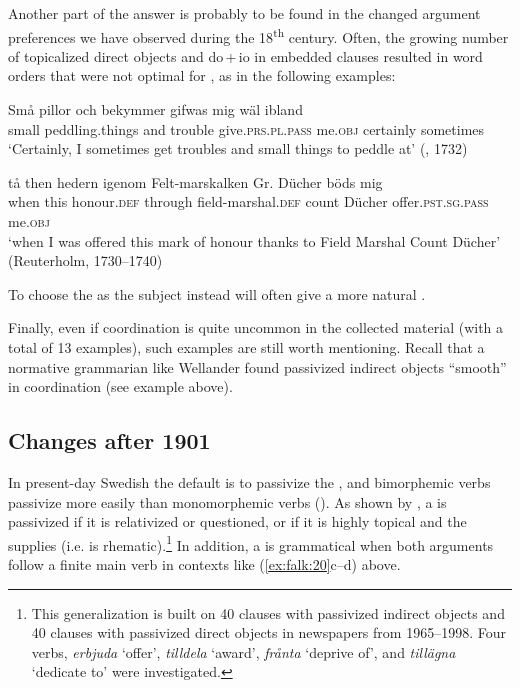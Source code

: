 \documentclass[output=paper]{langscibook}
\begin{document}
Another part of the answer is probably to be found in the changed argument preferences we have observed during the 18\textsuperscript{th} century. Often, the growing number of topicalized direct objects and do\,+\,io in embedded clauses resulted in word orders that were not optimal for , as in the following examples:


\ea%
    \label{ex:falk:26}

\ea
\gll Små  pillor          och  bekymmer  gifwas        mig    wäl ibland\\
      small  peddling.things  and  trouble     give.\textsc{prs.pl.pass}  me.\textsc{obj}  certainly              sometimes\\
\glt ‘Certainly, I sometimes get troubles and small things to peddle at’ (, 1732)

\ex
\gll tå    then  hedern    igenom  Felt-marskalken    Gr.      Dücher böds            mig\\
when  this  honour.\textsc{def}  through  field-marshal.\textsc{def}    count    Dücher      offer.\textsc{pst.sg.pass}    me\textsc{.obj}\\
\glt ‘when I was offered this mark of honour thanks to Field Marshal Count Dücher’ (Reuterholm, 1730–1740)
\z
\z


To choose the  as the subject instead will often give a more natural .


Finally, even if coordination is quite uncommon in the collected material (with a total of 13 examples), such examples are still worth mentioning. Recall that a normative grammarian like Wellander found passivized indirect objects “smooth” in coordination (see example  above).


\subsection{Changes after 1901}\label{sec:falk:5.3}


In present-day Swedish the default is to passivize the , and bimorphemic verbs passivize more easily than monomorphemic  verbs (\citealt{HolmbergPlatzack1995,Lundquist2004,HaddicanHolmberg2019}). As shown by \citet{Lundquist2004}, a  is passivized if it is relativized or questioned, or if it is highly topical and the  supplies  (i.e. is rhematic).\footnote{This generalization is built on 40 clauses with passivized indirect objects and 40 clauses with passivized direct objects in newspapers from 1965–1998. Four verbs, \textit{erbjuda} ‘offer’, \textit{tilldela} ‘award’, \textit{frånta} ‘deprive of’, and \textit{tillägna} ‘dedicate to’ were investigated.} In addition, a  is grammatical when both arguments follow a finite main verb in contexts like (\ref{ex:falk:20}c–d) above. 
\end{document}
